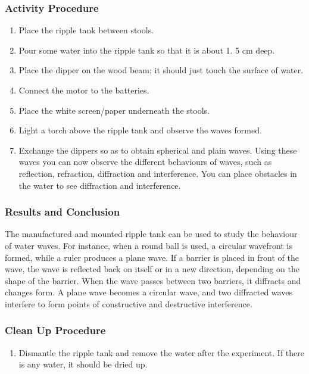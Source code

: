 \subsubsection*{Activity Procedure}
\begin{enumerate}
\item{Place the ripple tank between stools.} 
\item{Pour some water into the ripple tank so that it is about 1.  5 cm deep.} 
\item{Place the dipper on the wood beam; it should just touch the surface of water.} 
\item{Connect the motor to the batteries.} 
\item{Place the white screen/paper underneath the stools.} 
\item{Light a torch above the ripple tank and observe the waves formed.} 
\item{Exchange the dippers so as to obtain spherical and plain waves. Using these waves you can now observe the different behaviours of waves, such as reflection, refraction, diffraction and interference. You can place obstacles in the water to see diffraction and interference.} 
\end{enumerate}

\subsubsection*{Results and Conclusion}
The manufactured and mounted ripple tank can be used to study the behaviour of water waves.  For instance, when a round ball is used, a circular wavefront is formed, while a ruler produces a plane wave.  If a barrier is placed in front of the wave, the wave is reflected back on itself or in a new direction, depending on the shape of the barrier.  When the wave passes between two barriers, it diffracts and changes form.  A plane wave becomes a circular wave, and two diffracted waves interfere to form points of constructive and destructive interference.

\subsubsection*{Clean Up Procedure}
\begin{enumerate}
\item{Dismantle the ripple tank and remove the water after the experiment. If there is any water, it should be dried up.} 
\end{enumerate}

